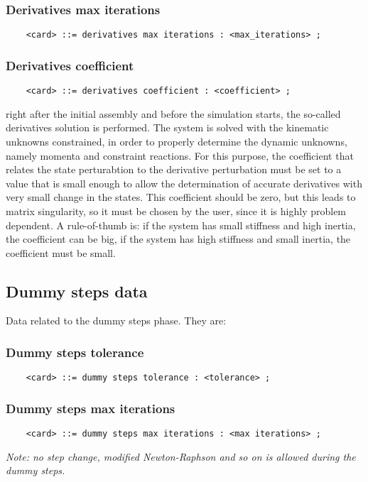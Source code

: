 \subsubsection{Derivatives max iterations}
\begin{verbatim}
    <card> ::= derivatives max iterations : <max_iterations> ;
\end{verbatim}

\subsubsection{Derivatives coefficient}
\begin{verbatim}
    <card> ::= derivatives coefficient : <coefficient> ;
\end{verbatim}
right after the initial assembly and before the simulation starts, the
so-called derivatives solution is performed. The system is solved with
the kinematic unknowns constrained, in order to properly determine the
dynamic unknowns, namely momenta and constraint reactions. For this
purpose, the coefficient that relates the state perturabtion to the
derivative perturbation must be set to a value that is small enough to
allow the determination of accurate derivatives with very small change
in the states. This coefficient should be zero, but this leads to matrix
singularity, so it must be chosen by the user, since it is highly
problem dependent. A rule-of-thumb is: if the system has small
stiffness and high inertia, the coefficient can be big, if the system
has high stiffness and small inertia, the coefficient must be small.


\subsection{Dummy steps data}
Data related to the dummy steps phase. They are:

\subsubsection{Dummy steps tolerance}
\begin{verbatim}
    <card> ::= dummy steps tolerance : <tolerance> ;
\end{verbatim}

\subsubsection{Dummy steps max iterations}
\begin{verbatim}
    <card> ::= dummy steps max iterations : <max iterations> ;
\end{verbatim}    
{\em
    Note: no step change, modified Newton-Raphson and so on is allowed
    during the dummy steps.
}

